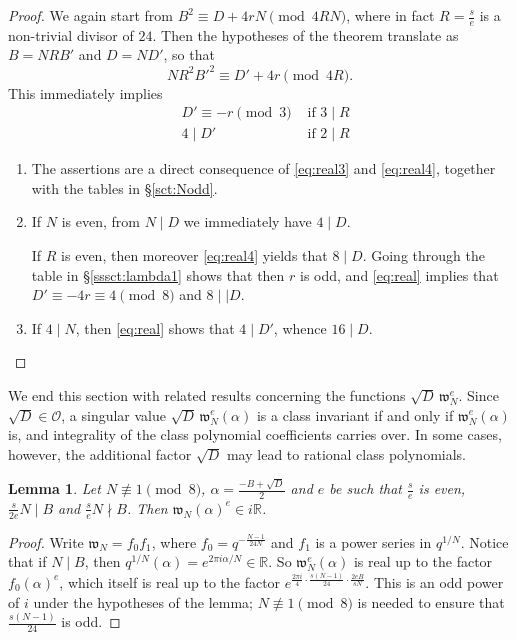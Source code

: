 \documentclass[12pt,twoside,leqno]{article}
\newtheorem{lemma}[theorem]{Lemma}
\numberwithin{equation}{section}
\newcommand{\w}{\mathfrak w}
\newcommand{\OO}{\mathcal O}
\newcommand{\R}{\mathbb R}
\newenvironment {alphenumerate}
   {\renewcommand {\labelenumi}{(\alph {enumi})}
    \renewcommand {\labelenumii}{(\alph {enumi}\arabic {enumii})}
    \begin {enumerate}}
   {\end {enumerate}}
\begin{document}
\begin{proof}
We again start from $B^2 \equiv D + 4 r N \pmod {4 R N}$, where
in fact $R = \frac {s}{e}$ is a non-trivial divisor of $24$. Then
the hypotheses of the theorem translate as $B = N R B'$ and
$D = N D'$, so that
\begin{equation}\label{eq:real}
N R^2 {B'}^2\equiv D' + 4 r \pmod {4 R}.
\end{equation}
This immediately implies
\begin {align}
\label{eq:real3}
& D' \equiv -r \pmod 3 & \text { if } 3 \mid R \\
\label{eq:real4}
& 4 \mid D'            & \text { if } 2 \mid R
\end {align}

\begin {alphenumerate}
\item
The assertions are a direct consequence of \eqref{eq:real3} and
\eqref{eq:real4}, together with the tables in \S\ref{sct:Nodd}.

\item
If $N$ is even, from $N \mid D$ we immediately have $4 \mid D$.

If $R$ is even, then moreover \eqref{eq:real4} yields that $8 \mid D$.
Going through the table in \S\ref{sssct:lambda1} shows that then $r$
is odd, and \eqref{eq:real} implies
that $D' \equiv -4r \equiv 4 \pmod 8$ and $8 \mid\mid D$.

\item
If $4 \mid N$, then \eqref{eq:real} shows that $4 \mid D'$, whence $16 \mid D$.
\end {alphenumerate}
\end{proof}

We end this section with related results concerning the functions
$\sqrt{D} \, \w_N^e$. Since $\sqrt {D} \in \OO$, a singular value
$\sqrt{D} \, \w_N^e (\alpha)$ is a class invariant if and only if
$\w_N^e (\alpha)$ is, and integrality of the class polynomial coefficients
carries over. In some cases, however, the additional factor $\sqrt D$
may lead to rational class polynomials.

\begin{lemma}\label{lem:v}
Let $N \not\equiv 1 \pmod 8$,
$\alpha = \frac {-B+\sqrt{D}}{2}$ and $e$ be such that
$\frac {s}{e}$ is even, $\frac {s}{2 e} N \mid B$ and
$\frac {s}{e} N \nmid B$. Then $\w_N(\alpha)^e \in i\R$.
\end{lemma}

\begin{proof}
Write $\w_N = f_0 f_1$, where $f_0 = q^{- \frac {N-1}{24 N}}$ and
$f_1$ is a power series in $q^{1/N}$.
Notice that if $N \mid B$, then
$q^{1/N} (\alpha) = e^{2 \pi i \alpha / N} \in \R$.
So $\w_N^e (\alpha)$ is real up to the factor $f_0 (\alpha)^e$,
which itself is real up to the factor
$e^{\frac {2 \pi i}{4} \cdot \frac {s (N-1)}{24}
\cdot \frac {2 e B}{s N}}$.
This is an odd power of $i$ under the hypotheses of the lemma;
$N \not\equiv 1 \pmod 8$ is needed to ensure that
$\frac {s (N - 1)}{24}$ is odd.
\end{proof}
\end{document}
